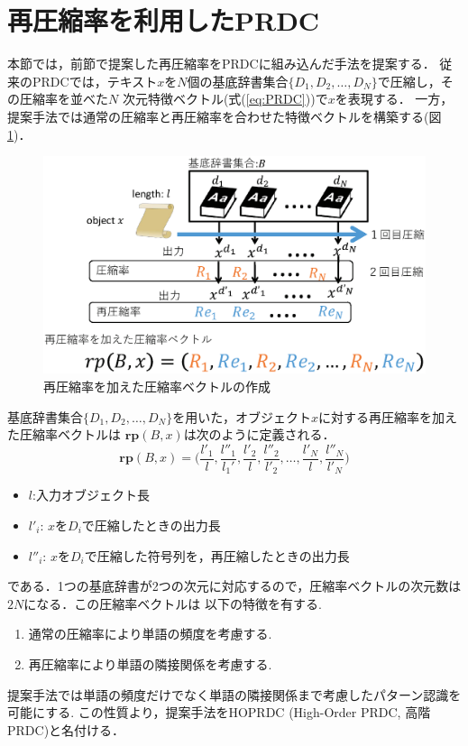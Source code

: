 \section{再圧縮率を利用したPRDC}
本節では，前節で提案した再圧縮率をPRDCに組み込んだ手法を提案する．
従来のPRDCでは，テキスト$x$を$N$個の基底辞書集合$\{D_1,D_2,\dots,D_N\}$で圧縮し，その圧縮率を並べた$N$
次元特徴ベクトル(式(\ref{eq:PRDC}))で$x$を表現する．
一方，提案手法では通常の圧縮率と再圧縮率を合わせた特徴ベクトルを構築する(図\ref{fig:HOPRDC.eps})．

\begin{figure}[tb]
\centering
\includegraphics[clip, width=\columnwidth]{image/HOPRDC.eps}
\caption{再圧縮率を加えた圧縮率ベクトルの作成}
\label{fig:HOPRDC.eps}
\end{figure}

基底辞書集合$\{D_1,D_2,\dots,D_N\}$を用いた，オブジェクト$x$に対する再圧縮率を加えた圧縮率ベクトルは
$\boldsymbol{rp}(B,x)$は次のように定義される．
\begin{equation}
\boldsymbol{rp}(B,x) = \biggl(\frac{l'_1}{l}, \frac{l''_1}{l_1'}, \frac{l'_2}{l}, \frac{l''_2}{l'_2}, \dots, \frac{l'_N}{l}, \frac{l''_N}{l'_N} \biggr)
\end{equation}
\begin{itemize}
	\item $l $:入力オブジェクト長
	\item $l'_i$: $x$を$D_i$で圧縮したときの出力長
	\item $l''_i$: $x$を$D_i$で圧縮した符号列を，再圧縮したときの出力長
\end{itemize}
である．1つの基底辞書が2つの次元に対応するので，圧縮率ベクトルの次元数は$2N$になる．この圧縮率ベクトルは
以下の特徴を有する.
\begin{enumerate}
	\item 通常の圧縮率により単語の頻度を考慮する.
	\item 再圧縮率により単語の隣接関係を考慮する.
\end{enumerate}
提案手法では単語の頻度だけでなく単語の隣接関係まで考慮したパターン認識を可能にする.
この性質より，提案手法をHOPRDC (High-Order PRDC, 高階PRDC)と名付ける．

